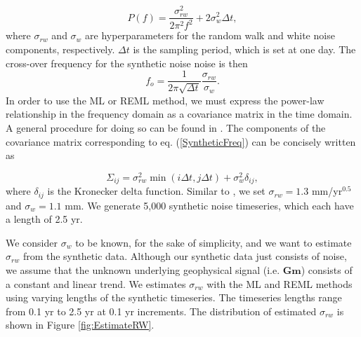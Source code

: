 \documentclass[10pt,a4paper]{article}
\begin{document}
\begin{equation}\label{SyntheticFreq}
P(f) = \frac{\sigma_{rw}^2}{2\pi^2 f^2} + 2\sigma_w^2\Delta t,
\end{equation}  
where $\sigma_{rw}$ and $\sigma_w$ are hyperparameters for the random walk and white noise components, respectively. $\Delta t$ is the sampling period, which is set at one day. The cross-over frequency for the synthetic noise noise is then
\begin{equation}\label{Crossover}
f_o = \frac{1}{2\pi\sqrt{\Delta t}}\frac{\sigma_{rw}}{\sigma_w}.  
\end{equation}
In order to use the ML or REML method, we must express the power-law relationship in the frequency domain as a covariance matrix in the time domain. A general procedure for doing  so can be found in \citet{Langbein2004}. The components of the covariance matrix corresponding to eq. (\ref{SyntheticFreq}) can be concisely written as

\begin{equation}\label{Covariance}
\Sigma_{ij} = \sigma_{rw}^2 \min(i\Delta t,j\Delta t) + \sigma_w^2 \delta_{ij},
\end{equation} 
where $\delta_{ij}$ is the Kronecker delta function. Similar to \citet{Langbein2012}, we set $\sigma_{rw} = 1.3$ mm/yr$^{0.5}$ and $\sigma_w = 1.1$ mm. We generate 5,000 synthetic noise timeseries, which each have a length of 2.5 yr. 

We consider $\sigma_w$ to be known, for the sake of simplicity, and we want to estimate $\sigma_{rw}$ from the synthetic data. Although our synthetic data just consists of noise, we assume that the unknown underlying geophysical signal (i.e. $\mathbf{G}\mathbf{m}$) consists of a constant and linear trend. We estimates $\sigma_{rw}$ with the ML and REML methods using varying lengths of the synthetic timeseries. The timeseries lengths range from 0.1 yr to 2.5 yr at 0.1 yr increments. The distribution of estimated $\sigma_{rw}$ is shown in Figure \ref{fig:EstimateRW}. 
\end{document}
